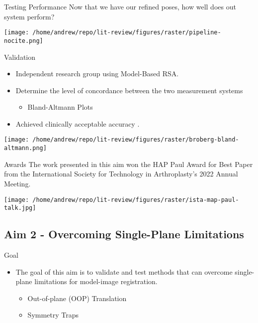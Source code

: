 \documentclass[presentation, aspectratio=1610]{beamer}
\begin{document}
\begin{frame}[label={sec:org6859577}]{Testing Performance}
Now that we have our refined poses, how well does out system perform?
\begin{center}
\texttt{[image: /home/andrew/repo/lit-review/figures/raster/pipeline-nocite.png]}
\end{center}
\end{frame}
\begin{frame}[label={sec:org5b6cffa}]{Validation}
\begin{itemize}
\item Independent research group using Model-Based RSA.
\item Determine the level of concordance between the two measurement systems
\begin{itemize}
\item Bland-Altmann Plots
\end{itemize}
\item Achieved clinically acceptable accuracy \autocites{brobergValidationMachineLearning2023}[][]{jensenJointTrackMachine2022}.
\end{itemize}
\begin{center}
\texttt{[image: /home/andrew/repo/lit-review/figures/raster/broberg-bland-altmann.png]}
\end{center}
\end{frame}
\begin{frame}[label={sec:org45abba8}]{Awards}
The work presented in this aim won the HAP Paul Award for Best Paper from the International Society for Technology in Arthroplasty's 2022 Annual Meeting.
\begin{center}
\texttt{[image: /home/andrew/repo/lit-review/figures/raster/ista-map-paul-talk.jpg]}
\end{center}
\end{frame}
\subsection{Aim 2 - Overcoming Single-Plane Limitations}
\label{sec:org117c56b}
\begin{frame}[label={sec:org6bfc9e2}]{Goal}
\begin{itemize}
\item The goal of this aim is to validate and test methods that can overcome single-plane limitations for model-image registration.
\begin{itemize}
\item Out-of-plane (OOP) Translation
\item Symmetry Traps
\end{itemize}
\end{itemize}
\end{frame}
\end{document}

